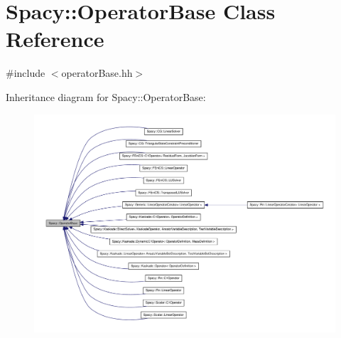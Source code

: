 \hypertarget{classSpacy_1_1OperatorBase}{\section{\-Spacy\-:\-:\-Operator\-Base \-Class \-Reference}
\label{classSpacy_1_1OperatorBase}
}


{\ttfamily \#include $<$operator\-Base.\-hh$>$}



\-Inheritance diagram for \-Spacy\-:\-:\-Operator\-Base\-:
\nopagebreak
\begin{figure}[H]
\begin{center}
\leavevmode
\includegraphics[width=350pt]{classSpacy_1_1OperatorBase__inherit__graph}
\end{center}
\end{figure}
